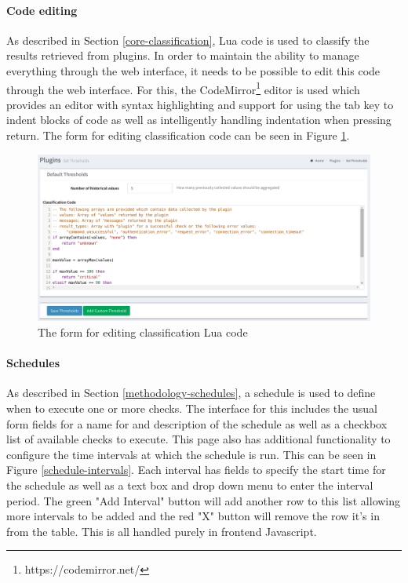 \documentclass[bsc,logo,twoside]{infthesis}
\begin{document}
\paragraph*{Code editing}
	As described in Section \ref{core-classification}, Lua code is used to classify
	the results retrieved from plugins.  In order to maintain the ability to manage
	everything through the web interface, it needs to be possible to edit this code
	through the web interface.  For this, the
	CodeMirror\footnote{https://codemirror.net/} editor is used which provides an
	editor with syntax highlighting and support for using the tab key to indent
	blocks of code as well as intelligently handling indentation when pressing
	return.  The form for editing classification code can be seen in Figure
	\ref{set-thresholds}.

\begin{figure}[H]
	\caption{The form for editing classification Lua code}
	\label{set-thresholds}
	\includegraphics[scale=0.45]{assets/screenshots/set-thresholds.pdf}
\end{figure}

\paragraph*{Schedules}
	As described in Section \ref{methodology-schedules}, a schedule is used to
	define when to execute one or more checks.  The interface for this includes the
	usual form fields for a name for and description of the schedule as well as a
	checkbox list of available checks to execute.  This page also has additional
	functionality to configure the time intervals at which the schedule is run. This
	can be seen in Figure \ref{schedule-intervals}.  Each interval has fields to
	specify the start time for the schedule as well as a text box and drop down menu
	to enter the interval period.  The green "Add Interval" button will add another
	row to this list allowing more intervals to be added and the red "X" button will
	remove the row it's in from the table.  This is all handled purely in frontend
	Javascript.
	
\end{document}
